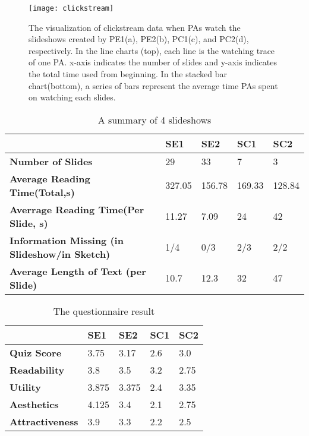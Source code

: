 \begin{figure}
 \centering %
 \texttt{[image: clickstream]}
 \caption{The visualization of clickstream data when PAs watch the slideshows created by PE1(a), PE2(b), PC1(c), and PC2(d), respectively. In the line charts (top), each line is the watching trace of one PA. x-axis indicates the number of slides and y-axis indicates the total time used from beginning. In the stacked bar chart(bottom), a series of bars represent the average time PAs spent on watching each slides. }
 \label{fig:clickstream}
\end{figure}



\begin{table}
  \caption{A summary of 4 slideshows}
  \label{tab:slides1}
  \small
  \centering
  \begin{tabu}{p{2cm}|p{0.9cm}|p{0.9cm}|p{0.9cm}|p{0.9cm}}
  \toprule
 \textbf{} &\textbf{SE1} & \textbf{SE2} & \textbf{SC1}& \textbf{SC2} \\ 
   \midrule
  \textbf{Number of Slides } & 29  & 33 & 7 & 3 \\ 
 \midrule
  \textbf{Average Reading Time(Total,s)} & 327.05 & 156.78 & 169.33 & 128.84\\ 
 \midrule
  \textbf{Averrage Reading Time(Per Slide, s)} & 11.27 & 7.09 &24 & 42\\ 
   \midrule
  \textbf{Information Missing (in Slideshow/in Sketch) }& 1/4 & 0/3 & 2/3 & 2/2\\ 
     \midrule
  \textbf{Average Length of Text (per Slide) }& 10.7 & 12.3 & 32 & 47\\ 
    
  \bottomrule

  \end{tabu}
  \vspace{1mm}
\end{table}



\begin{table}[tb]
  \caption{The questionnaire result}
  \label{tab:slides2}
  \small
  \centering
  \begin{tabular}{p{1.5cm}|p{0.9cm}|p{0.9cm}|p{0.9cm}|p{0.9cm}}
  \toprule
 \textbf{} &\textbf{SE1} & \textbf{SE2} & \textbf{SC1}& \textbf{SC2} \\ 
   \midrule
  \textbf{Quiz Score } & 3.75  & 3.17 & 2.6 & 3.0 \\ 
 \midrule
 \midrule
  \textbf{Readability} & 3.8 & 3.5 & 3.2& 2.75\\ 
 \midrule
  \textbf{Utility} & 3.875 & 3.375 & 2.4 & 3.35\\ 
   \midrule
  \textbf{Aesthetics }  & 4.125 & 3.4 & 2.1& 2.75\\ 
  \midrule
  \textbf{Attractiveness} & 3.9 & 3.3 & 2.2 & 2.5\\ 
  
  \bottomrule

  \end{tabular}
  \vspace{1mm}
\end{table}

